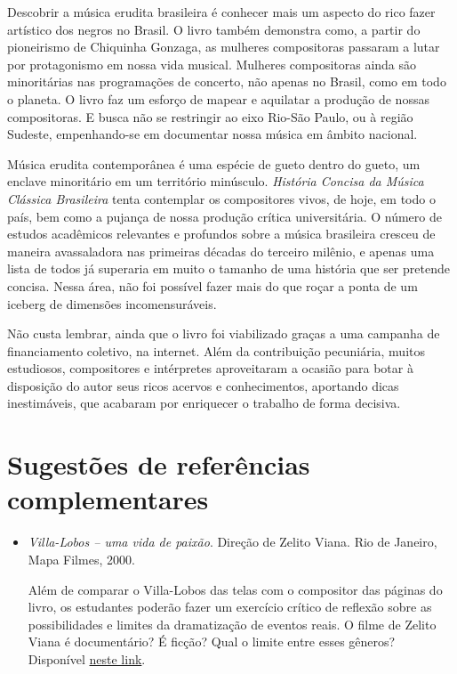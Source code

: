 \documentclass[11pt]{extarticle}
\begin{document}
Descobrir a música erudita brasileira é conhecer mais um aspecto do rico
fazer artístico dos negros no Brasil. O livro também demonstra como, a
partir do pioneirismo de Chiquinha Gonzaga, as mulheres compositoras
passaram a lutar por protagonismo em nossa vida musical. Mulheres
compositoras ainda são minoritárias nas programações de concerto, não
apenas no Brasil, como em todo o planeta. O livro faz um esforço de
mapear e aquilatar a produção de nossas compositoras. E busca não se
restringir ao eixo Rio-São Paulo, ou à região Sudeste, empenhando-se em
documentar nossa música em âmbito nacional.

Música erudita contemporânea é uma espécie de gueto dentro do gueto, um
enclave minoritário em um território minúsculo. \emph{História Concisa
da Música Clássica Brasileira} tenta contemplar os compositores vivos,
de hoje, em todo o país, bem como a pujança de nossa produção crítica
universitária. O número de estudos acadêmicos relevantes e profundos
sobre a música brasileira cresceu de maneira avassaladora nas primeiras
décadas do terceiro milênio, e apenas uma lista de todos já superaria em
muito o tamanho de uma história que ser pretende concisa. Nessa área,
não foi possível fazer mais do que roçar a ponta de um iceberg de
dimensões incomensuráveis.

Não custa lembrar, ainda que o livro foi viabilizado graças a uma
campanha de financiamento coletivo, na internet. Além da contribuição
pecuniária, muitos estudiosos, compositores e intérpretes aproveitaram a
ocasião para botar à disposição do autor seus ricos acervos e
conhecimentos, aportando dicas inestimáveis, que acabaram por enriquecer
o trabalho de forma decisiva.

\section{Sugestões de referências complementares}

\begin{itemize}
\item 
\emph{Villa-Lobos -- uma vida de paixão}. Direção de Zelito Viana. Rio
de Janeiro, Mapa Filmes, 2000.

Além de comparar o Villa-Lobos das telas com o compositor das
páginas do livro, os estudantes poderão fazer um exercício crítico de
reflexão sobre as possibilidades e limites da dramatização de eventos
reais. O filme de Zelito Viana é documentário? É ficção? Qual o limite
entre esses gêneros? Disponível \href{https://www.youtube.com/watch?v=5WFFxGjxUv4
}{neste link}.
\end{itemize}
\end{document}
